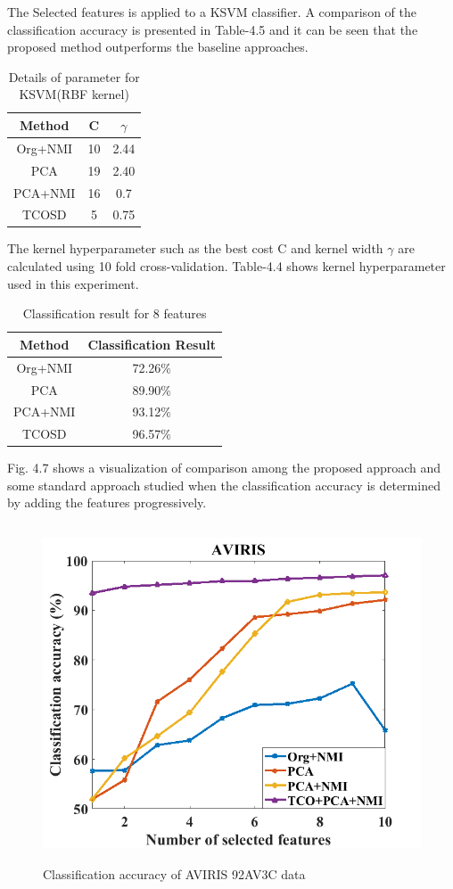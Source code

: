 \documentclass[document.tex]{subfiles}
\begin{document}
\noindent The Selected features is applied to a KSVM classifier. A comparison of the classification accuracy is presented in Table-4.5 and it can be seen that the proposed method outperforms the baseline approaches.
\begin{table}[H]
	\caption{Details of parameter for KSVM(RBF kernel)}
	\begin{center}
		\begin{tabular}{|c|c|c|}
			\hline
			Method & C & $\gamma$ \\ \hline
			Org+NMI & 10 & 2.44 \\ \hline
			PCA & 19 & 2.40 \\ \hline
			PCA+NMI & 16 & 0.7\\ \hline
			TCOSD & 5 & 0.75\\ \hline
		\end{tabular}
	\end{center}
	\label{tab:Details of parameter for KSVM(RBF kernel)}
\end{table}
\noindent The kernel hyperparameter such as the best cost C and kernel width $\gamma$ are calculated using 10 fold cross-validation\cite{29}. Table-4.4 shows kernel hyperparameter used in this experiment.
\begin{table}[H]
	\caption{Classification result for 8 features}
	\begin{center}
		\begin{tabular}{|c|c|}
			\hline
			Method & Classification Result\\ \hline
			Org+NMI & 72.26\%\\ \hline
			PCA & 89.90\%\\ \hline
			PCA+NMI & 93.12\%\\ \hline
			TCOSD& 96.57\%\\ \hline
		\end{tabular}
	\end{center}
	\label{tab:Classification result for 10 features}
\end{table}
\noindent Fig. 4.7 shows a visualization of comparison among the proposed approach and some standard approach studied when the classification accuracy is determined by adding the features progressively.\\
\begin{figure}[H]
	\begin{center}
		\includegraphics[height=10.0cm]{imgs/Res.png}
	\end{center}
	\caption{Classification accuracy of AVIRIS 92AV3C data}
	\label{fig:Classification accuracy of AVIRIS 92AV3C data}
\end{figure}
\end{document}
